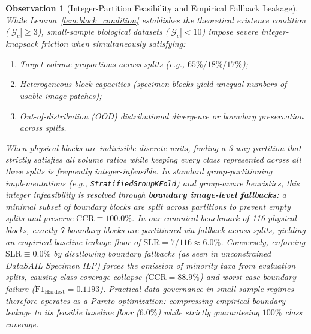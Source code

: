 \documentclass[a4paper,fleqn]{cas-sc}
\newtheorem{observation}{Observation}
\begin{document}
\begin{observation}[Integer-Partition Feasibility and Empirical Fallback Leakage]
\label{obs:trilemma}
While Lemma~\ref{lem:block_condition} establishes the theoretical existence condition ($|\mathcal{G}_c| \ge 3$), small-sample biological datasets ($|\mathcal{G}_c| < 10$) impose severe integer-knapsack friction when simultaneously satisfying:
\begin{enumerate}
\item[(a)] Target volume proportions across splits (e.g., $65\%/18\%/17\%$);
\item[(b)] Heterogeneous block capacities (specimen blocks yield unequal numbers of usable image patches);
\item[(c)] Out-of-distribution (OOD) distributional divergence or boundary preservation across splits.
\end{enumerate}
When physical blocks are indivisible discrete units, finding a 3-way partition that strictly satisfies all volume ratios while keeping every class represented across all three splits is frequently integer-infeasible. In standard group-partitioning implementations (e.g., \texttt{StratifiedGroupKFold}) and group-aware heuristics, this integer infeasibility is resolved through \textbf{boundary image-level fallbacks}: a minimal subset of boundary blocks are split across partitions to prevent empty splits and preserve $\mathrm{CCR} \equiv 100.0\%$. In our canonical benchmark of 116 physical blocks, exactly 7 boundary blocks are partitioned via fallback across splits, yielding an empirical baseline leakage floor of $\mathrm{SLR} = 7 / 116 \approx 6.0\%$. Conversely, enforcing $\mathrm{SLR} \equiv 0.0\%$ by disallowing boundary fallbacks (as seen in unconstrained DataSAIL Specimen ILP) forces the omission of minority taxa from evaluation splits, causing class coverage collapse ($\mathrm{CCR} = 88.9\%$) and worst-case boundary failure ($\mathrm{F1}_{\text{Hardest}} = 0.1193$). Practical data governance in small-sample regimes therefore operates as a Pareto optimization: compressing empirical boundary leakage to its feasible baseline floor ($6.0\%$) while strictly guaranteeing $100\%$ class coverage.
\end{observation}
\end{document}
